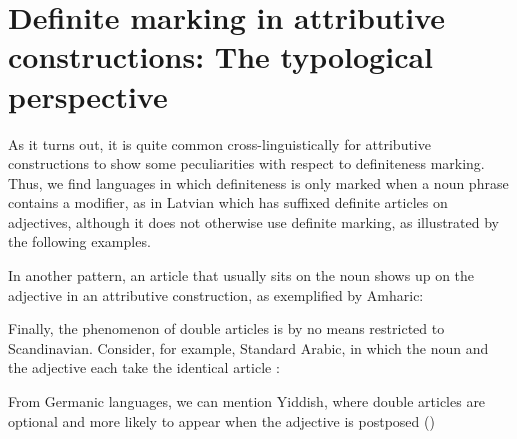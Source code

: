 \section{Definite marking in attributive constructions: The typological perspective}

As it turns out, it is quite common cross-linguistically for attributive constructions to show some peculiarities with respect to definiteness marking. Thus, we find languages in which definiteness is only marked when a noun phrase contains a modifier, as in Latvian which has suffixed definite articles on adjectives, although it does not otherwise use definite marking, as illustrated by the following examples. 

\ea\label{}

\z 
\z 

In another pattern, an article that usually sits on the noun shows up on the adjective in an attributive construction, as exemplified by Amharic:

\ea\label{}

\z 
\z 

Finally, the phenomenon of double articles is by no means restricted to Scandinavian. Consider, for example, Standard Arabic, in which the noun and the adjective each take the identical article :

\ea\label{}

\z 
\z 

From Germanic languages, we can mention Yiddish, where double articles are optional and more likely to appear when the adjective is postposed (\citet[342-347]{Plank2003})

